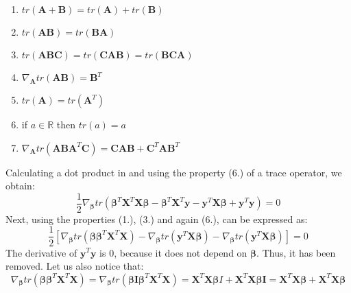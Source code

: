 \documentclass[english,a4paper,twoside]{ppfcmthesis}
\begin{document}
\begin{appendices}
\begin{enumerate}
    \item $tr(\boldsymbol{A}+\boldsymbol{B}) = tr(\boldsymbol{A})+tr(\boldsymbol{B})$
    \item $tr(\boldsymbol{AB}) = tr(\boldsymbol{BA})$
    \item $tr(\boldsymbol{ABC}) = tr(\boldsymbol{CAB}) = tr(\boldsymbol{BCA})$
    \item $\nabla_{\boldsymbol{A}}tr(\boldsymbol{AB}) = \boldsymbol{B}^T$
    \item $tr(\boldsymbol{A})=tr(\boldsymbol{A}^T)$
    \item if $a \in \mathbb{R}$ then $tr(a)=a$
    \item $\nabla_{\boldsymbol{A}}tr(\boldsymbol{ABA}^T\boldsymbol{C}) = \boldsymbol{CAB}+\boldsymbol{C}^T\boldsymbol{AB}^T$
\end{enumerate}
Calculating a dot product in  and using the property (6.) of a trace operator, we obtain:
\begin{equation}\label{eq:least2}
    \frac{1}{2} \nabla_{\boldsymbol{\beta}} tr(\boldsymbol{\beta}^T\boldsymbol{X}^T\boldsymbol{X}\boldsymbol{\beta}-\boldsymbol{\beta}^T\boldsymbol{X}^T\boldsymbol{y}-\boldsymbol{y}^T\boldsymbol{X}\boldsymbol{\beta}+\boldsymbol{y}^T\boldsymbol{y}) = 0
\end{equation}
Next, using the properties (1.), (3.) and again (6.),  can be expressed as:
\begin{equation}\label{eq:least3}
    \frac{1}{2}[\nabla_{\boldsymbol{\beta}}tr(\boldsymbol{\beta}\boldsymbol{\beta}^T\boldsymbol{X}^T\boldsymbol{X})-\nabla_{\boldsymbol{\beta}}tr(\boldsymbol{y}^T\boldsymbol{X}\boldsymbol{\beta})-\nabla_{\boldsymbol{\beta}}tr(\boldsymbol{y}^T\boldsymbol{X}\boldsymbol{\beta})] = 0
\end{equation}
The derivative of $\boldsymbol{y}^T\boldsymbol{y}$ is $0$, because it does not depend on $\boldsymbol{\beta}$. Thus, it has been removed. Let us also notice that:
\begin{equation}\label{eq:least4}
    \nabla_{\boldsymbol{\beta}}tr(\boldsymbol{\beta}\boldsymbol{\beta}^T\boldsymbol{X}^T\boldsymbol{X}) = \nabla_{\boldsymbol{\beta}}tr(\boldsymbol{\beta}\boldsymbol{I}\boldsymbol{\beta}^T\boldsymbol{X}^T\boldsymbol{X}) = \boldsymbol{X}^T\boldsymbol{X}\boldsymbol{\beta}I + \boldsymbol{X}^T\boldsymbol{X}\boldsymbol{\beta}\boldsymbol{I} = \boldsymbol{X}^T\boldsymbol{X}\boldsymbol{\beta}+\boldsymbol{X}^T\boldsymbol{X}\boldsymbol{\beta}
\end{equation}

\end{appendices}
\end{document}
